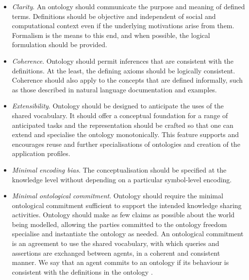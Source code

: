 	\begin{itemize}
		\item \textit{Clarity}. An ontology should communicate the purpose and meaning of defined terms. Definitions should be objective and independent of social and computational context even if the underlying motivations arise from them. Formalism is the means to this end, and when possible, the logical formulation should be provided.
		\item \textit{Coherence}. Ontology should permit inferences that are consistent with the definitions. At the least, the defining axioms should be logically consistent. Coherence should also apply to the concepts that are defined informally, such as those described in natural language documentation and examples.
		\item \textit{Extensibility}. Ontology should be designed to anticipate the uses of the shared vocabulary. It should offer a conceptual foundation for a range of anticipated tasks and the representation should be crafted so that one can extend and specialise the ontology monotonically. This feature supports and encourages reuse and further specialisations of ontologies and creation of the application profiles. 
		\item \textit{Minimal encoding bias}. The conceptualisation should be specified at the knowledge level without depending on a particular symbol-level encoding. 
		\item \textit{Minimal ontological commitment}. Ontology should require the minimal ontological commitment sufficient to support the intended knowledge sharing activities. Ontology should make as few claims as possible about the world being modelled, allowing the parties committed to the ontology freedom specialise and instantiate the ontology as needed. An ontological commitment is an agreement to use the shared vocabulary, with which queries and assertions are exchanged between agents, in a coherent and consistent manner. We say that an agent commits to an ontology if its behaviour is consistent with the definitions in the ontology \cite{gruber1995}.		
	\end{itemize}	